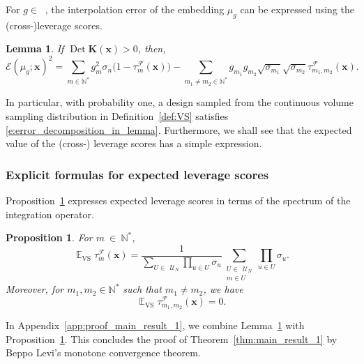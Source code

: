 \documentclass[twoside,11pt]{book}
\newtheorem{corollary}{Corollary}
\newtheorem{proposition}{Proposition}
\newtheorem{lemma}{Lemma}
\numberwithin{theorem}{chapter}
\numberwithin{definition}{chapter}
\numberwithin{proposition}{chapter}
\numberwithin{corollary}{chapter}
\numberwithin{example}{chapter}
\numberwithin{lemma}{chapter}
\DeclareMathOperator{\Det}{Det}
\DeclareMathOperator{\VS}{\mathrm{VS}}
\DeclareMathOperator{\EX}{\mathbb{E}}
\DeclareMathOperator{\F}{\mathcal{F}}
\DeclareMathOperator{\Ltwo}{\mathbb{L}_{2}(\mathrm{d} \omega)}
\def\UN{\:\mathcal{U}_N}
\begin{document}
For $g \in \Ltwo$, the interpolation error of the embedding $\mu_{g}$ can be expressed using the (cross-)leverage scores.
\begin{lemma}\label{lemma:error_decomposition}
If $\Det \bm{K}(\bm{x}) > 0$, then,
\begin{equation}
\label{e:error_decomposition_in_lemma}
\mathcal{E}(\mu_{g};\bm{x})^{2}  = \sum\limits_{m \in \mathbb{N}^{*}}  g_{m}^{2} \sigma_{n}\bigg(1- \tau_{m}^{\F}(\bm{x})\bigg) - \sum\limits_{m_{1}\neq m_{2} \in \mathbb{N}^{*}}  g_{m_{1}}g_{m_{2}} \sqrt{\sigma_{m_{1}}} \sqrt{\sigma_{m_{2}}} \tau_{m_{1},m_{2}}^{\F}(\bm{x}).
\end{equation}
\end{lemma}
In particular, with probability one, a design sampled from the continuous volume sampling distribution in Definition~\ref{def:VS} satisfies \eqref{e:error_decomposition_in_lemma}. Furthermore, we shall see that the expected value of the (cross-) leverage scores has a simple expression.


\subsubsection{Explicit formulas for expected leverage scores}
\label{sec:closed_formulas}
Proposition~\ref{prop:EX_VS_lvs} expresses expected leverage scores in terms of the spectrum of the integration operator.
\begin{proposition}\label{prop:EX_VS_lvs}
For $m~\in~\mathbb{N}^{*}$,
\begin{equation}\label{eq:lvs_formula}
\EX_{\VS} \tau_{m}^{\F}(\bm{x})  = \frac{1}{\sum\limits_{U \in \: \UN} \prod\limits_{u \in U}\sigma_{u}}  \sum\limits_{\substack{U \in \: \UN \\ m \in U}} \prod\limits_{u \in U}\sigma_{u}.
\end{equation}
Moreover, for $m_{1},m_{2} \in \mathbb{N}^{*}$ such that $m_{1} \neq m_{2}$, we have
\begin{equation}\label{eq:cross_lvs_zero}
\EX_{\VS} \tau_{m_{1},m_{2}}^{\F}(\bm{x}) = 0.
\end{equation}
\end{proposition}

In Appendix~\ref{app:proof_main_result_1}, we combine Lemma~\ref{lemma:error_decomposition} with Proposition~\ref{prop:EX_VS_lvs}. This concludes the proof of Theorem~\ref{thm:main_result_1} by Beppo Levi's monotone convergence theorem.

\end{document}
